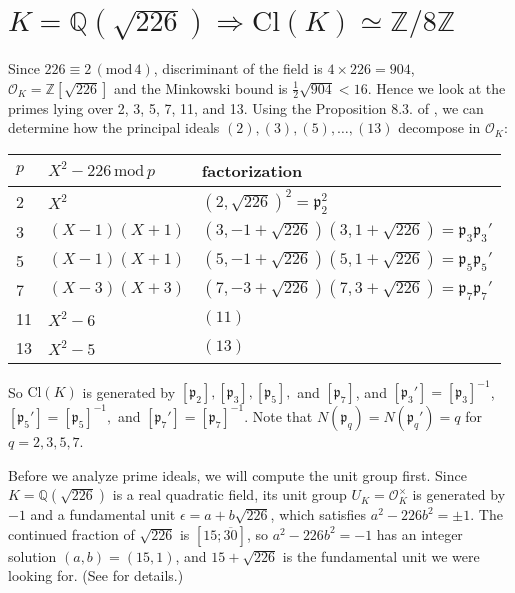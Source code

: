 \documentclass{article}
\newcommand{\Cl}{\mathrm{Cl}}
\newcommand{\Mod}[1]{\,(\mathrm{mod}\,#1)}
\begin{document}
\section{$K = \mathbb{Q}(\sqrt{226})\Rightarrow \Cl(K) \simeq \mathbb{Z}/8\mathbb{Z}$}
Since $226 \equiv 2\Mod{4}$, discriminant of the field is $4\times 226 = 904$, $\mathcal{O}_{K} = \mathbb{Z}[\sqrt{226}]$ and the Minkowski bound is $\frac{1}{2}\sqrt{904}  < 16$. Hence we  look at the primes lying over 2, 3, 5, 7, 11, and 13. 
Using the Proposition 8.3. of \cite{neu}, we can determine how the principal  ideals $(2), (3), (5), \dots, (13)$ decompose in $\mathcal{O}_{K}$: 
\begin{center}
\begin{tabular}{|l|l|l|}
\hline
$p$ & $X^{2} - 226 \,\mathrm{mod}\, p$ & factorization                         \\ \hline
2   & $X^{2}$                          & $(2,\sqrt{226})^{2} = \mathfrak{p}_{2}^{2}$                  \\ \hline
3   & $(X-1)(X+1)$                     & $(3, -1+\sqrt{226})(3, 1+\sqrt{226}) = \mathfrak{p}_{3}\mathfrak{p}_{3}'$ \\ \hline
5   & $(X-1)(X+1)$                     & $(5, -1+\sqrt{226})(5, 1+\sqrt{226}) = \mathfrak{p}_{5}\mathfrak{p}_{5}{'}$ \\ \hline
7   & $(X-3)(X+3)$                     & $(7, -3+\sqrt{226})(7, 3+\sqrt{226}) =\mathfrak{p}_{7}\mathfrak{p}_{7}'$ \\ \hline
11  & $X^{2} - 6$                      & $(11)$                                \\ \hline
13  & $X^{2} - 5$                      & $(13)$                                \\ \hline
\end{tabular}
\end{center}
So $\Cl(K)$ is generated by $[\mathfrak{p}_{2}], [\mathfrak{p}_{3}], [\mathfrak{p}_{5}],$ and $[\mathfrak{p}_{7}]$, and $[\mathfrak{p}_{3}'] = [\mathfrak{p}_{3}]^{-1}$, $[\mathfrak{p}_{5}'] = [\mathfrak{p}_{5}]^{-1},$ and $[\mathfrak{p}_{7}'] = [\mathfrak{p}_{7}]^{-1}$. Note that $N(\mathfrak{p}_{q}) = N(\mathfrak{p}_{q}') = q$ for $q = 2, 3, 5, 7$. 

Before we analyze prime ideals, we will compute the unit group first. Since $K = \mathbb{Q}(\sqrt{226})$ is a real quadratic field, its unit group $U_{K} = \mathcal{O}_{K}^{\times}$ is generated by $-1$ and a fundamental unit $\epsilon = a+ b\sqrt{226}$, which satisfies $a^{2} - 226 b^{2} = \pm 1$. 
The continued fraction of $\sqrt{226}$ is $[15; \overline{30}]$, so $a^{2} - 226 b^{2} = -1$ has an integer solution $(a, b)=(15, 1)$, and $15+\sqrt{226}$ is the fundamental unit we were looking for. (See \cite{wol} for details.)
\end{document}
